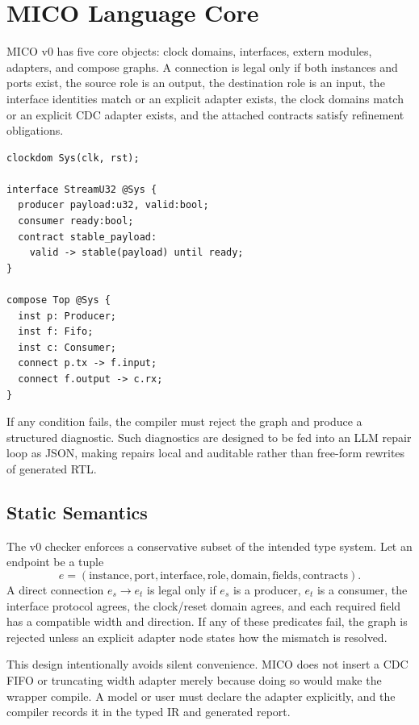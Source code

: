 \section{MICO Language Core}

MICO v0 has five core objects: clock domains, interfaces, extern modules, adapters, and compose graphs. A connection is legal only if both instances and ports exist, the source role is an output, the destination role is an input, the interface identities match or an explicit adapter exists, the clock domains match or an explicit CDC adapter exists, and the attached contracts satisfy refinement obligations.

\begin{verbatim}
clockdom Sys(clk, rst);

interface StreamU32 @Sys {
  producer payload:u32, valid:bool;
  consumer ready:bool;
  contract stable_payload:
    valid -> stable(payload) until ready;
}

compose Top @Sys {
  inst p: Producer;
  inst f: Fifo;
  inst c: Consumer;
  connect p.tx -> f.input;
  connect f.output -> c.rx;
}
\end{verbatim}

If any condition fails, the compiler must reject the graph and produce a structured diagnostic. Such diagnostics are designed to be fed into an LLM repair loop as JSON, making repairs local and auditable rather than free-form rewrites of generated RTL.

\subsection{Static Semantics}

The v0 checker enforces a conservative subset of the intended type system. Let an endpoint be a tuple
\[
  e = (\text{instance}, \text{port}, \text{interface}, \text{role}, \text{domain}, \text{fields}, \text{contracts}).
\]
A direct connection \(e_s \rightarrow e_t\) is legal only if \(e_s\) is a producer, \(e_t\) is a consumer, the interface protocol agrees, the clock/reset domain agrees, and each required field has a compatible width and direction. If any of these predicates fail, the graph is rejected unless an explicit adapter node states how the mismatch is resolved.

\begin{table}[t]
  \centering
  \caption{Compiler static checks and representative diagnostics}
  \resizebox{\columnwidth}{!}{}
\end{table}

This design intentionally avoids silent convenience. MICO does not insert a CDC FIFO or truncating width adapter merely because doing so would make the wrapper compile. A model or user must declare the adapter explicitly, and the compiler records it in the typed IR and generated report.
